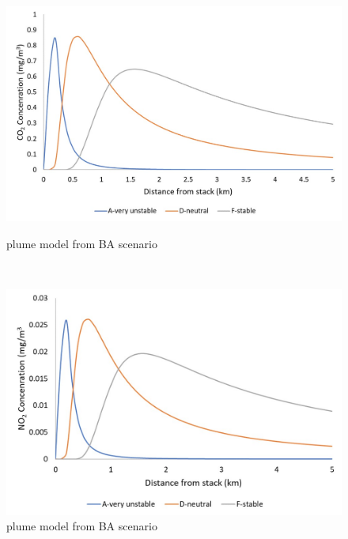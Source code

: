 \begin{figure}[h]
    \centering
    \begin{minipage}[t]{0.5\textwidth}
        \centering
        \includegraphics[width=\linewidth]{chapters/5-safety-layout-environment/figures/CO2plumeBA.jpg}
        \caption{ plume model from BA scenario}
        \label{fig:CO2plumeBA}
    \end{minipage}%
    ~ 
    \begin{minipage}[t]{0.5\textwidth}
        \centering
        \includegraphics[width=\linewidth]{chapters/5-safety-layout-environment/figures/NO2plumeBA.jpg}
        \caption{ plume model from BA scenario}
         \label{fig:NO2plumeBA}
    \end{minipage}
    
\end{figure}
\\

